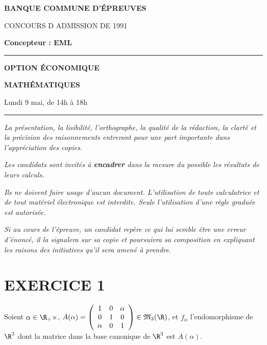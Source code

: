 \documentclass[11pt]{article}%
\begin{document}

\begin{center}
{\LARG\E\textbf{BANQUE COMMUNE D'ÉPREUVES}}



{\large \textsc{CONCOURS D ADMISSION DE 1991}}



{\large \textbf{Concepteur : EML}}



\rule{2.39cm}{0.05cm}



{\Large \textbf{OPTION ÉCONOMIQUE}}



{\Large \textbf{MATHÉMATIQUES }}



{\Large Lundi 9 mai, de 14h à 18h}



\rule{2.39cm}{0.05cm}
\end{center}

\textit{La présentation, la lisibilité, l'orthographe, la qualité
de la rédaction, la clarté et la précision des raisonnements
entreront pour une part importante dans l'appréciation des copies.}

\textit{Les candidats sont invités à \textbf{encadrer} dans la mesure
du possible les résultats de leurs calculs.}

\textit{Ils ne doivent faire usage d'aucun document. L'utilisation de
toute
calculatrice et de tout matériel électronique est interdite. Seule
l'utilisation d'une règle graduée est autorisée.}

\textit{Si au cours de l'épreuve, un candidat repère ce qui lui semble
être une erreur d'énoncé, il la signalera sur sa copie et
poursuivra sa composition en expliquant les raisons des initiatives
qu'il sera
amené à prendre.}

\vspace*{3cm}
\section*{EXERCICE 1}

Soient $\alpha \in \R_{+}{\times }$, $A(\alpha ) = \left( 
\begin{array}{ccc}
1 & 0 & \alpha \\
0 & 1 & 0 \\
\alpha & 0 & 1
\end{array}
\right) \in \mathfrak{M}_{3}(\R)$, et $f_{\alpha }$ l'endomorphisme
de $\R^{3}$ dont la matrice dans la base canonique de $\R^{3}
$ est $A(\alpha )$.
\end{document}
